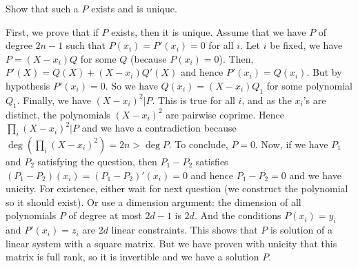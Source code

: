 \documentclass[11pt]{exam}
\theoremstyle{definition}
\begin{document}
\begin{questions}
\question Show that such a $P$ exists and is unique. 
\begin{solution}
First, we prove that if $P$ exists, then it is unique. Assume that we have $P$ of degree $2n-1$ such that $P(x_i) = P'(x_i) = 0$ for all $i$. Let $i$ be fixed, we have $P=(X-x_i)Q$ for some $Q$ (because $P(x_i) = 0$). Then, $P'(X) = Q(X)+(X-x_i)Q'(X)$ and hence $P'(x_i) = Q(x_i)$. But by hypothesis $P'(x_i) = 0$. So we have $Q(x_i) = (X-x_i)Q_1$ for some polynomial $Q_1$. Finally, we have $(X-x_i)^2 | P$. This is true for all $i$, and as the $x_i$'s are distinct, the polynomials $(X-x_i)^2$ are pairwise coprime. Hence $\prod_i (X-x_i)^2 | P$ and we have a contradiction because $\deg(\prod_i (X-x_i)^2) = 2n > \deg P$. To conclude, $P = 0$. Now, if we have $P_1$ and $P_2$ satisfying the question, then $P_1-P_2$ satisfies $(P_1-P_2)(x_i) = (P_1-P_2)'(x_i) = 0$ and hence $P_1-P_2 = 0$ and we have unicity.
For existence, either wait for next question (we construct the polynomial so it should exist). Or use a dimension argument: the dimension of all polynomials $P$ of degree at most $2d-1$ is $2d$. And the conditions $P(x_i) = y_i$ and $P'(x_i) = z_i$ are $2d$ linear constraints. This shows that $P$ is solution of a linear system with a square matrix. But we have proven with unicity that this matrix is full rank, so it is invertible and we have a solution $P$.
\end{solution}


%  
%


\end{questions}
\end{document}
